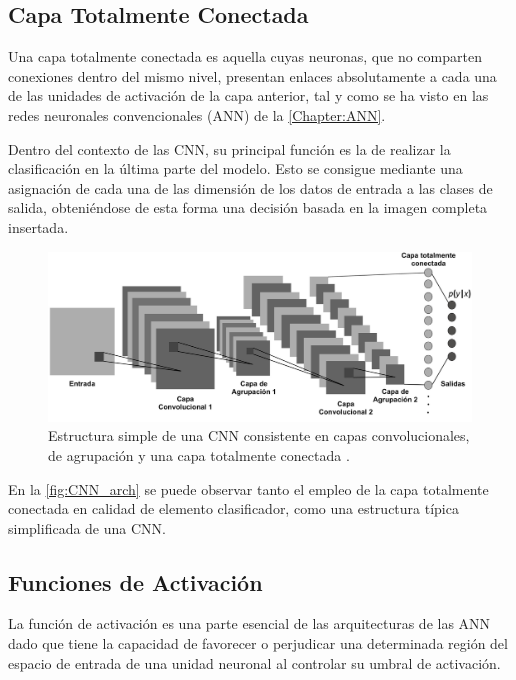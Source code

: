 \subsection{Capa Totalmente Conectada}

Una capa totalmente conectada es aquella cuyas neuronas, que no comparten conexiones dentro del mismo nivel, presentan enlaces absolutamente a cada una de las unidades de activación de la capa anterior, tal y como se ha visto en las redes neuronales convencionales (ANN) de la \autoref{Chapter:ANN}.

Dentro del contexto de las CNN, su principal función es la de realizar la clasificación en la última parte del modelo. Esto se consigue mediante una asignación de cada una de las dimensión de los datos de entrada a las clases de salida, obteniéndose de esta forma una decisión basada en la imagen completa insertada.

\begin{figure}
    \centering
    \includegraphics[width=\textwidth]{Images/CNN_architecture.png}
    \caption{Estructura simple de una CNN consistente en capas convolucionales, de agrupación y una capa totalmente conectada \cite{ArchitectureCNN}.}
    \label{fig:CNN_arch}
\end{figure}

En la \autoref{fig:CNN_arch} se puede observar tanto el empleo de la capa totalmente conectada en calidad de elemento clasificador, como una estructura típica simplificada de una CNN.

\subsection{Funciones de Activación}

La función de activación es una parte esencial de las arquitecturas de las ANN dado que tiene la capacidad de favorecer o perjudicar una determinada región del espacio de entrada de una unidad neuronal al controlar su umbral de activación.

